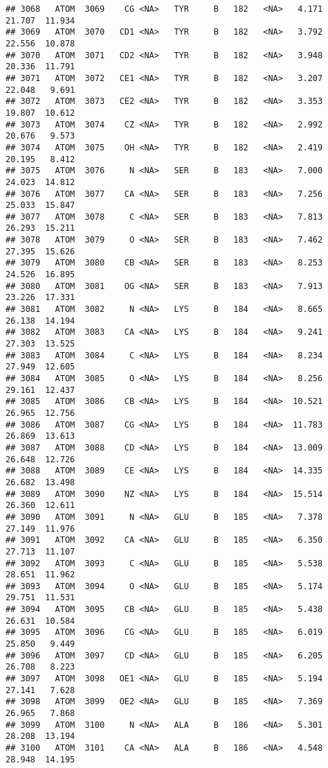 \documentclass[
]{article}
\begin{document}
\begin{verbatim}
## 3068   ATOM  3069    CG <NA>   TYR     B   182   <NA>   4.171  21.707  11.934
## 3069   ATOM  3070   CD1 <NA>   TYR     B   182   <NA>   3.792  22.556  10.878
## 3070   ATOM  3071   CD2 <NA>   TYR     B   182   <NA>   3.948  20.336  11.791
## 3071   ATOM  3072   CE1 <NA>   TYR     B   182   <NA>   3.207  22.048   9.691
## 3072   ATOM  3073   CE2 <NA>   TYR     B   182   <NA>   3.353  19.807  10.612
## 3073   ATOM  3074    CZ <NA>   TYR     B   182   <NA>   2.992  20.676   9.573
## 3074   ATOM  3075    OH <NA>   TYR     B   182   <NA>   2.419  20.195   8.412
## 3075   ATOM  3076     N <NA>   SER     B   183   <NA>   7.000  24.023  14.812
## 3076   ATOM  3077    CA <NA>   SER     B   183   <NA>   7.256  25.033  15.847
## 3077   ATOM  3078     C <NA>   SER     B   183   <NA>   7.813  26.293  15.211
## 3078   ATOM  3079     O <NA>   SER     B   183   <NA>   7.462  27.395  15.626
## 3079   ATOM  3080    CB <NA>   SER     B   183   <NA>   8.253  24.526  16.895
## 3080   ATOM  3081    OG <NA>   SER     B   183   <NA>   7.913  23.226  17.331
## 3081   ATOM  3082     N <NA>   LYS     B   184   <NA>   8.665  26.138  14.194
## 3082   ATOM  3083    CA <NA>   LYS     B   184   <NA>   9.241  27.303  13.525
## 3083   ATOM  3084     C <NA>   LYS     B   184   <NA>   8.234  27.949  12.605
## 3084   ATOM  3085     O <NA>   LYS     B   184   <NA>   8.256  29.161  12.437
## 3085   ATOM  3086    CB <NA>   LYS     B   184   <NA>  10.521  26.965  12.756
## 3086   ATOM  3087    CG <NA>   LYS     B   184   <NA>  11.783  26.869  13.613
## 3087   ATOM  3088    CD <NA>   LYS     B   184   <NA>  13.009  26.648  12.726
## 3088   ATOM  3089    CE <NA>   LYS     B   184   <NA>  14.335  26.682  13.498
## 3089   ATOM  3090    NZ <NA>   LYS     B   184   <NA>  15.514  26.360  12.611
## 3090   ATOM  3091     N <NA>   GLU     B   185   <NA>   7.378  27.149  11.976
## 3091   ATOM  3092    CA <NA>   GLU     B   185   <NA>   6.350  27.713  11.107
## 3092   ATOM  3093     C <NA>   GLU     B   185   <NA>   5.538  28.651  11.962
## 3093   ATOM  3094     O <NA>   GLU     B   185   <NA>   5.174  29.751  11.531
## 3094   ATOM  3095    CB <NA>   GLU     B   185   <NA>   5.438  26.631  10.584
## 3095   ATOM  3096    CG <NA>   GLU     B   185   <NA>   6.019  25.850   9.449
## 3096   ATOM  3097    CD <NA>   GLU     B   185   <NA>   6.205  26.708   8.223
## 3097   ATOM  3098   OE1 <NA>   GLU     B   185   <NA>   5.194  27.141   7.628
## 3098   ATOM  3099   OE2 <NA>   GLU     B   185   <NA>   7.369  26.965   7.868
## 3099   ATOM  3100     N <NA>   ALA     B   186   <NA>   5.301  28.208  13.194
## 3100   ATOM  3101    CA <NA>   ALA     B   186   <NA>   4.548  28.948  14.195

\end{verbatim}
\end{document}
